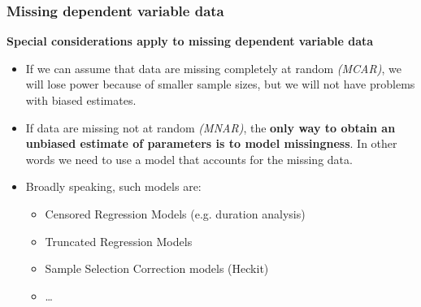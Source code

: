 \documentclass{beamer}
\begin{document}


\begin{frame}
\frametitle{Missing dependent variable data}

\textbf{Special considerations apply to missing dependent variable data}

\begin{itemize}
  \item If we can assume that data are missing completely at random \textit{(MCAR)}, we will lose power because of smaller sample sizes, but we will not have problems with biased estimates.
  \item If data are missing not at random \textit{(MNAR)}, the \textbf{only way to obtain an unbiased estimate of parameters is to model missingness}. In other words we need to use a model that accounts for the missing data.
  \item Broadly speaking, such models are:
  \begin{itemize}
    \item Censored Regression Models (e.g. duration analysis) 
    \item Truncated Regression Models 
    \item Sample Selection Correction models (Heckit)
    \item \dots
  \end{itemize}
\end{itemize}

\end{frame}





























\end{document}
